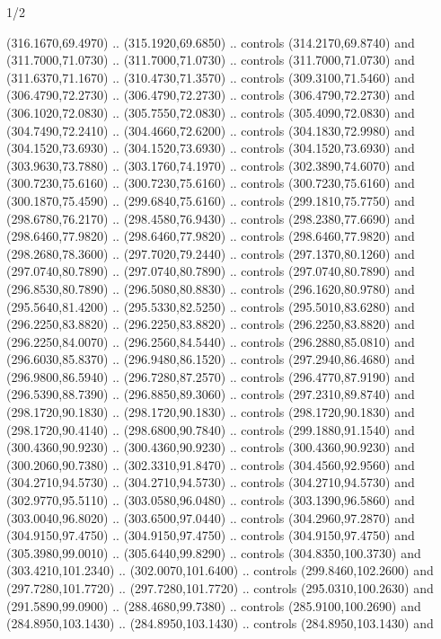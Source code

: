 \begin{flagdescription}{1/2}
\begin{scope}[xshift=0.5\flaglength]
\begin{scope}[scale=0.004\flagwidth,xshift=-90mm,yshift=89mm]
\begin{scope}[y=0.80pt, x=0.80pt, yscale=-1, xscale=1, inner sep=0pt, outer sep=0pt]
  (316.1670,69.4970) .. (315.1920,69.6850) .. controls (314.2170,69.8740) and
  (311.7000,71.0730) .. (311.7000,71.0730) .. controls (311.7000,71.0730) and
  (311.6370,71.1670) .. (310.4730,71.3570) .. controls (309.3100,71.5460) and
  (306.4790,72.2730) .. (306.4790,72.2730) .. controls (306.4790,72.2730) and
  (306.1020,72.0830) .. (305.7550,72.0830) .. controls (305.4090,72.0830) and
  (304.7490,72.2410) .. (304.4660,72.6200) .. controls (304.1830,72.9980) and
  (304.1520,73.6930) .. (304.1520,73.6930) .. controls (304.1520,73.6930) and
  (303.9630,73.7880) .. (303.1760,74.1970) .. controls (302.3890,74.6070) and
  (300.7230,75.6160) .. (300.7230,75.6160) .. controls (300.7230,75.6160) and
  (300.1870,75.4590) .. (299.6840,75.6160) .. controls (299.1810,75.7750) and
  (298.6780,76.2170) .. (298.4580,76.9430) .. controls (298.2380,77.6690) and
  (298.6460,77.9820) .. (298.6460,77.9820) .. controls (298.6460,77.9820) and
  (298.2680,78.3600) .. (297.7020,79.2440) .. controls (297.1370,80.1260) and
  (297.0740,80.7890) .. (297.0740,80.7890) .. controls (297.0740,80.7890) and
  (296.8530,80.7890) .. (296.5080,80.8830) .. controls (296.1620,80.9780) and
  (295.5640,81.4200) .. (295.5330,82.5250) .. controls (295.5010,83.6280) and
  (296.2250,83.8820) .. (296.2250,83.8820) .. controls (296.2250,83.8820) and
  (296.2250,84.0070) .. (296.2560,84.5440) .. controls (296.2880,85.0810) and
  (296.6030,85.8370) .. (296.9480,86.1520) .. controls (297.2940,86.4680) and
  (296.9800,86.5940) .. (296.7280,87.2570) .. controls (296.4770,87.9190) and
  (296.5390,88.7390) .. (296.8850,89.3060) .. controls (297.2310,89.8740) and
  (298.1720,90.1830) .. (298.1720,90.1830) .. controls (298.1720,90.1830) and
  (298.1720,90.4140) .. (298.6800,90.7840) .. controls (299.1880,91.1540) and
  (300.4360,90.9230) .. (300.4360,90.9230) .. controls (300.4360,90.9230) and
  (300.2060,90.7380) .. (302.3310,91.8470) .. controls (304.4560,92.9560) and
  (304.2710,94.5730) .. (304.2710,94.5730) .. controls (304.2710,94.5730) and
  (302.9770,95.5110) .. (303.0580,96.0480) .. controls (303.1390,96.5860) and
  (303.0040,96.8020) .. (303.6500,97.0440) .. controls (304.2960,97.2870) and
  (304.9150,97.4750) .. (304.9150,97.4750) .. controls (304.9150,97.4750) and
  (305.3980,99.0010) .. (305.6440,99.8290) .. controls (304.8350,100.3730) and
  (303.4210,101.2340) .. (302.0070,101.6400) .. controls (299.8460,102.2600) and
  (297.7280,101.7720) .. (297.7280,101.7720) .. controls (295.0310,100.2630) and
  (291.5890,99.0900) .. (288.4680,99.7380) .. controls (285.9100,100.2690) and
  (284.8950,103.1430) .. (284.8950,103.1430) .. controls (284.8950,103.1430) and

\end{scope}
\end{scope}
\end{scope}
\end{flagdescription}
